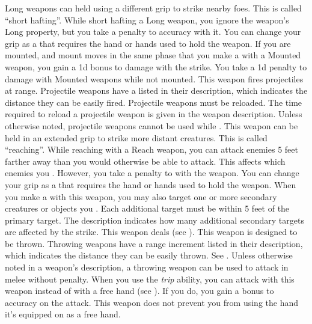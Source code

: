        Long weapons can held using a different grip to strike nearby foes.
        This is called ``short hafting''.
        While short hafting a Long weapon, you ignore the weapon's Long property, but you take a  penalty to accuracy with it.
        You can change your grip as a  that requires the hand or hands used to hold the weapon.
        \label{Mounted Weapon} If you are mounted, and mount moves in the same phase that you make a  with a Mounted weapon, you gain a \plus1d bonus to damage with the strike.
        You take a \minus1d penalty to damage with Mounted weapons while not mounted.
         This weapon fires projectiles at range. Projectile weapons have a  listed in their description, which indicates the distance they can be easily fired. Projectile weapons must be reloaded. The time required to reload a projectile weapon is given in the weapon description.
        Unless otherwise noted, projectile weapons cannot be used while \prone.
        \label{Reach Weapon} This weapon can be held in an extended grip to strike more distant creatures.
        This is called ``reaching''.
        While reaching with a Reach weapon, you can attack enemies 5 feet farther away than you would otherwise be able to attack.
        This affects which enemies you .
        However, you take a  penalty to  with the weapon.
        You can change your grip as a  that requires the hand or hands used to hold the weapon.
         When you make a  with this weapon, you may also target one or more secondary creatures or objects you .
        Each additional target must be within 5 feet of the primary target.
        The description indicates how many additional secondary targets are affected by the strike.
         This weapon deals  (see ).
         This weapon is designed to be thrown. Throwing weapons have a range increment listed in their description, which indicates the distance they can be easily thrown. See .
        Unless otherwise noted in a weapon's description, a throwing weapon can be used to attack in melee without penalty.
         When you use the \textit{trip} ability, you can attack with this weapon instead of with a free hand (see ).
        If you do, you gain a  bonus to accuracy on the attack.
         This weapon does not prevent you from using the hand it's equipped on as a free hand.


